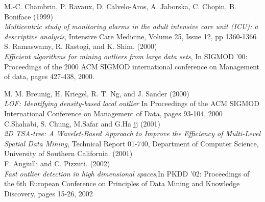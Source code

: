 \documentclass[12pt,a4paper]{article}
\begin{document}
\begin{thebibliography}{9}
M.-C. Chambrin, P. Ravaux, D. Calvelo-Aros, A. Jaborska, C. Chopin, B. Boniface (1999)\\
\textit{Multicentric study of monitoring alarms in the adult intensive care unit (ICU): a descriptive analysis},
Intensive Care Medicine, Volume 25, Issue 12, pp 1360-1366\\

S. Ramaswamy, R. Rastogi, and K. Shim. (2000)\\
\textit{Efficient algorithms for mining outliers from large data sets}, In
SIGMOD '00: Proceedings of the 2000 ACM SIGMOD international conference on Management of
data, pages 427-438, 2000.

M. M. Breunig, H. Kriegel, R. T. Ng, and J. Sander (2000)\\
\textit{LOF: Identifying density-based local outlier}
In Proceedings of the ACM SIGMOD International Conference on Management of Data, pages 93-104, 2000\\


C.Shahabi, S. Chung, M.Safar and G.Ha jj (2001)\\
\textit{2D TSA-tree: A Wavelet-Based Approach to Improve the Efficiency of Multi-Level Spatial Data Mining},
Technical Report 01-740, Department of Computer Science, University of Southern California. (2001)\\

F. Angiulli and C. Pizzuti. (2002)\\
\textit{Fast outlier detection in high dimensional spaces},In PKDD '02: Proceedings
of the 6th European Conference on Principles of Data Mining and Knowledge Discovery, pages 15-26,
2002


\end{thebibliography}
\end{document}
